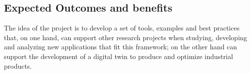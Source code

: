 \subsection*{Expected Outcomes and benefits}

The idea of the project is to develop a set of tools, examples and best practices that, on one hand, can support other research projects when studying, developing and analyzing new applications that fit this framework; on the other hand can support the development of a digital twin \cite{semeraro2021digital} to produce and optimize industrial products.

\newpage
